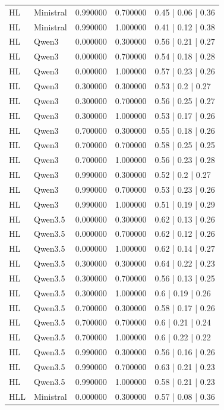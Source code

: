 \begin{longtable}{lllll}
HL & Ministral & 0.990000 & 0.700000 & 0.45 | 0.06 | 0.36 \\
HL & Ministral & 0.990000 & 1.000000 & 0.41 | 0.12 | 0.38 \\
HL & Qwen3 & 0.000000 & 0.300000 & 0.56 | 0.21 | 0.27 \\
HL & Qwen3 & 0.000000 & 0.700000 & 0.54 | 0.18 | 0.28 \\
HL & Qwen3 & 0.000000 & 1.000000 & 0.57 | 0.23 | 0.26 \\
HL & Qwen3 & 0.300000 & 0.300000 & 0.53 | 0.2 | 0.27 \\
HL & Qwen3 & 0.300000 & 0.700000 & 0.56 | 0.25 | 0.27 \\
HL & Qwen3 & 0.300000 & 1.000000 & 0.53 | 0.17 | 0.26 \\
HL & Qwen3 & 0.700000 & 0.300000 & 0.55 | 0.18 | 0.26 \\
HL & Qwen3 & 0.700000 & 0.700000 & 0.58 | 0.25 | 0.25 \\
HL & Qwen3 & 0.700000 & 1.000000 & 0.56 | 0.23 | 0.28 \\
HL & Qwen3 & 0.990000 & 0.300000 & 0.52 | 0.2 | 0.27 \\
HL & Qwen3 & 0.990000 & 0.700000 & 0.53 | 0.23 | 0.26 \\
HL & Qwen3 & 0.990000 & 1.000000 & 0.51 | 0.19 | 0.29 \\
HL & Qwen3.5 & 0.000000 & 0.300000 & 0.62 | 0.13 | 0.26 \\
HL & Qwen3.5 & 0.000000 & 0.700000 & 0.62 | 0.12 | 0.26 \\
HL & Qwen3.5 & 0.000000 & 1.000000 & 0.62 | 0.14 | 0.27 \\
HL & Qwen3.5 & 0.300000 & 0.300000 & 0.64 | 0.22 | 0.23 \\
HL & Qwen3.5 & 0.300000 & 0.700000 & 0.56 | 0.13 | 0.25 \\
HL & Qwen3.5 & 0.300000 & 1.000000 & 0.6 | 0.19 | 0.26 \\
HL & Qwen3.5 & 0.700000 & 0.300000 & 0.58 | 0.17 | 0.26 \\
HL & Qwen3.5 & 0.700000 & 0.700000 & 0.6 | 0.21 | 0.24 \\
HL & Qwen3.5 & 0.700000 & 1.000000 & 0.6 | 0.22 | 0.22 \\
HL & Qwen3.5 & 0.990000 & 0.300000 & 0.56 | 0.16 | 0.26 \\
HL & Qwen3.5 & 0.990000 & 0.700000 & 0.63 | 0.21 | 0.23 \\
HL & Qwen3.5 & 0.990000 & 1.000000 & 0.58 | 0.21 | 0.23 \\
HLL & Ministral & 0.000000 & 0.300000 & 0.57 | 0.08 | 0.36 \\

\end{longtable}
